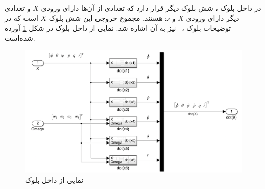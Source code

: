 در داخل بلوک
،
شش بلوک دیگر قرار دارد که تعدادی از آن‌ها دارای ورودی $X$ و تعدادی دیگر دارای ورودی $X$ و $\omega$ هستند. مجموع خروجی این شش بلوک $\dot X$ است که در توضیحات بلوک
،
 نیز به آن اشاره شد.
نمایی از داخل بلوک
در شکل \ref{all-six} آورده شده‌است.
\begin{figure}[H]
	\includegraphics[width=16cm]{../Figures/QuadSimulation/all-six.png}
	\centering
	\caption{نمایی از داخل بلوک }
	\label{all-six}
\end{figure}